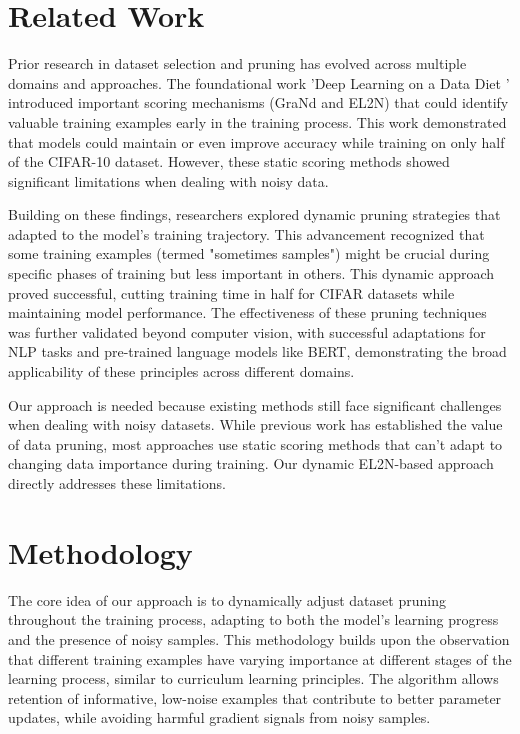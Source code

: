 \documentclass{article}
\begin{document}
\section{Related Work}

Prior research in dataset selection \cite{mirzasoleiman2019}\cite{mirzasoleiman2020} and pruning has evolved across multiple domains and approaches. The foundational work 'Deep Learning on a Data Diet \cite{paul2021}' introduced important scoring mechanisms (GraNd and EL2N) that could identify valuable training examples early in the training process. This work demonstrated that models could maintain or even improve accuracy while training on only half of the CIFAR-10 dataset. However, these static scoring methods showed significant limitations when dealing with noisy data.

Building on these findings, researchers explored dynamic pruning strategies that adapted to the model's training trajectory. This advancement recognized that some training examples (termed "sometimes samples") might be crucial during specific phases of training but less important in others. This dynamic approach proved successful, cutting training time in half for CIFAR datasets while maintaining model performance. The effectiveness of these pruning techniques was further validated beyond computer vision, with successful adaptations for NLP tasks and pre-trained language models like BERT, demonstrating the broad applicability of these principles across different domains.

Our approach is needed because existing methods still face significant challenges when dealing with noisy datasets. While previous work has established the value of data pruning, most approaches use static scoring methods that can't adapt to changing data importance during training. Our dynamic EL2N-based approach directly addresses these limitations.

\section{Methodology}

The core idea of our approach is to dynamically adjust dataset pruning throughout the training process, adapting to both the model's learning progress and the presence of noisy samples. This methodology builds upon the observation that different training examples have varying importance at different stages of the learning process, similar to curriculum learning principles. The algorithm allows retention of informative, low-noise examples that contribute to better parameter updates, while avoiding harmful gradient signals from noisy samples.
\end{document}
